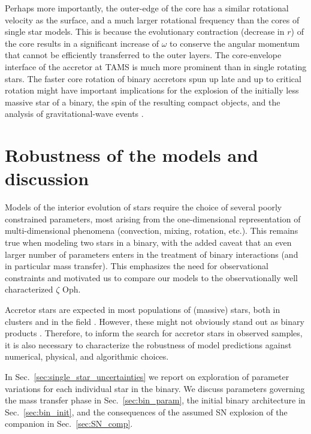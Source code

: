 \documentclass[twocolumn,twocolappendix,trackchanges]{aastex63}
\DeclareRobustCommand{\Secref}[1]{Sec.~\ref{#1}}
\newcommand{\zoph}{$\zeta$ Oph}
\begin{document}
Perhaps more importantly, the outer-edge of the core has a similar
rotational velocity as the surface, and a much larger rotational frequency than the
cores of single star models. This is because the
evolutionary contraction (decrease in $r$) of the core results in a
significant increase of $\omega$ to conserve the angular momentum that
cannot be efficiently transferred to the outer layers. The core-envelope interface
of the accretor at TAMS is much more prominent than in single rotating
stars. The faster core rotation of binary accretors spun up late and
up to critical rotation might have important implications for the
explosion of the initially less massive star of a binary, the
spin of the resulting compact objects, and the analysis of
gravitational-wave events \citep[e.g.,][]{zaldarriaga:18, qin:18, callister:21}.

\section{Robustness of the models and discussion}
\label{sec:discussion}

Models of the interior evolution of stars require the choice of
several poorly constrained parameters, most arising from the
one-dimensional representation of multi-dimensional phenomena
(convection, mixing, rotation, etc.). This remains true when modeling
two stars in a binary, with the added caveat that an even larger
number of parameters enters in the treatment of binary interactions (and in
particular mass transfer). This emphasizes the need for
observational constraints and motivated us to compare our models to
the observationally well characterized \zoph.

Accretor stars are expected in most populations of (massive)
stars, both in clusters \citep[e.g.,][]{chen:09, wang:20} and in the field
\citep[e.g.,][]{demink:11, demink:13}. However, these might not obviously stand
out as binary products \citep[e.g.,][]{renzo:19walk}. Therefore, to
inform the search for accretor stars in observed samples, it is
also necessary to characterize the robustness of model predictions
against numerical, physical, and algorithmic choices.

In \Secref{sec:single_star_uncertainties}
we report on exploration of parameter variations for each individual
star in the binary. We discuss parameters governing the mass transfer phase in
\Secref{sec:bin_param}, the initial binary architecture in
\Secref{sec:bin_init}, and the consequences of the assumed SN
explosion of the companion in \Secref{sec:SN_comp}.
\end{document}
